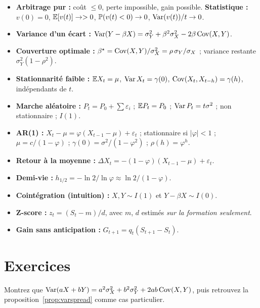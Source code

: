 \documentclass[11pt,a4paper]{article}
\begin{document}
\begin{whiteboard}
\begin{itemize}[leftmargin=1.2em]
\item \textbf{Arbitrage pur :} coût $\le 0$, perte impossible, gain possible. \textbf{Statistique :} $v(0)=0$, $\mathbb{E}[v(t)]\to>0$, $\mathbb{P}(v(t)<0)\to0$, $\operatorname{Var}(v(t))/t\to0$.
\item \textbf{Variance d'un écart :} $\operatorname{Var}(Y-\beta X) = \sigma_Y^2 + \beta^2\sigma_X^2 - 2\beta\operatorname{Cov}(X,Y)$.
\item \textbf{Couverture optimale :} $\beta^\star = \operatorname{Cov}(X,Y)/\sigma_X^2 = \rho\,\sigma_Y/\sigma_X$ ; variance restante $\sigma_Y^2(1-\rho^2)$.
\item \textbf{Stationnarité faible :} $\mathbb{E} X_t = \mu$, $\operatorname{Var} X_t = \gamma(0)$, $\operatorname{Cov}(X_t,X_{t-h}) = \gamma(h)$, indépendants de $t$.
\item \textbf{Marche aléatoire :} $P_t = P_0 + \sum\varepsilon_i$ ; $\mathbb{E} P_t = P_0$ ; $\operatorname{Var} P_t = t\sigma^2$ ; non stationnaire ; $I(1)$.
\item \textbf{AR(1) :} $X_t - \mu = \varphi(X_{t-1}-\mu) + \varepsilon_t$ ; stationnaire si $|\varphi|<1$ ; $\mu = c/(1-\varphi)$ ; $\gamma(0) = \sigma^2/(1-\varphi^2)$ ; $\rho(h) = \varphi^h$.
\item \textbf{Retour à la moyenne :} $\Delta X_t = -(1-\varphi)(X_{t-1}-\mu) + \varepsilon_t$.
\item \textbf{Demi-vie :} $h_{1/2} = -\ln2/\ln\varphi \approx \ln 2/(1-\varphi)$.
\item \textbf{Cointégration (intuition) :} $X, Y \sim I(1)$ et $Y - \beta X \sim I(0)$.
\item \textbf{Z-score :} $z_t = (S_t - m)/d$, avec $m$, $d$ estimés \emph{sur la formation seulement}.
\item \textbf{Gain sans anticipation :} $G_{t+1} = q_t(S_{t+1}-S_t)$.
\end{itemize}
\end{whiteboard}

\section{Exercices}

\begin{exercise}
Montrez que $\operatorname{Var}(aX + bY) = a^2\sigma_X^2 + b^2\sigma_Y^2 + 2ab\operatorname{Cov}(X,Y)$, puis retrouvez la proposition~\ref{prop:varspread} comme cas particulier.
\end{exercise}
\end{document}
